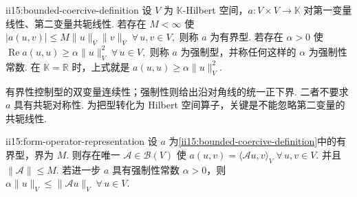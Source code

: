 \begin{FADefinition}[C][有界型与强制型]{ii15:bounded-coercive-definition}
设 \(\displaystyle V\) 为 \(\displaystyle\mathbb K\)-Hilbert 空间，\(\displaystyle a:V\times V\to\mathbb K\) 对第一变量线性、第二变量共轭线性. 若存在 \(\displaystyle M<\infty\) 使 \(\displaystyle |a(u,v)| \leqslant M\|u\|_V\|v\|_V \; \forall\,u,v\in V,\)
则称 \(\displaystyle a\) 为有界型. 若存在 \(\displaystyle\alpha>0\) 使 \(\displaystyle \operatorname{Re}a(u,u) \geqslant \alpha\|u\|_V^2 \; \forall\,u\in V,\)
则称 \(\displaystyle a\) 为强制型，并称任何这样的 \(\displaystyle\alpha\) 为强制性常数. 在 \(\displaystyle\mathbb K=\mathbb R\) 时，上式就是 \(\displaystyle a(u,u)\geqslant\alpha\|u\|_V^2\).
\end{FADefinition}

有界性控制型的双变量连续性；强制性则给出沿对角线的统一正下界. 二者不要求 \(\displaystyle a\) 具有共轭对称性. 为把型转化为 Hilbert 空间算子，关键是不能忽略第二变量的共轭线性.

\begin{FAProposition}{ii15:form-operator-representation}
设 \(\displaystyle a\) 为\autoref{ii15:bounded-coercive-definition}中的有界型，界为 \(\displaystyle M\). 则存在唯一 \(\displaystyle\mathcal A\in\mathcal B(V)\) 使 \(\displaystyle a(u,v) = \langle\mathcal Au,v\rangle_V \; \forall\,u,v\in V.\)
并且 \(\displaystyle\|\mathcal A\|\leqslant M\). 若进一步 \(\displaystyle a\) 具有强制性常数 \(\displaystyle\alpha>0\)，则 \(\displaystyle \alpha\|u\|_V \leqslant \|\mathcal Au\|_V \; \forall\,u\in V.\)
\end{FAProposition}

